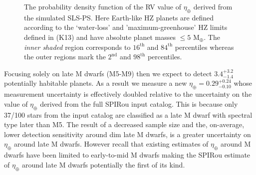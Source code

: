 \begin{figure}
  \centering
  \caption{The probability density function of the RV value of $\eta_{\oplus}$ derived from
    the simulated SLS-PS. Here Earth-like HZ planets are defined according to the `water-loss'
    and 'maximum-greenhouse' HZ limits defined in \citealt{kopparapu13} (K13) and have absolute planet
    masses $\leq 5$ M$_{\oplus}$. The \emph{inner shaded} region corresponds to $16^{\text{th}}$ and
    $84^{\text{th}}$ percentiles whereas the outer regions mark the $2^{\text{nd}}$ and
    $98^{\text{th}}$ percentiles.}
  \label{BSfig:etaEarth}
\end{figure}

Focusing solely on late M dwarfs (M5-M9) then we expect to detect
$3.4^{+3.2}_{-1.4}$ potentially habitable planets. As a result we measure a new 
$\eta_{\oplus}=0.29^{+0.24}_{-0.10}$ whose measurement uncertainty is effectively doubled 
relative to the uncertainty on the value of $\eta_{\oplus}$ derived from the full SPIRou input
catalog. This is because only 37/100 stars from the input catalog are
classified as a late M dwarf with spectral type later than M5. The result of a decreased sample size and the,
on-average, lower detection sensitivity around dim late M dwarfs, is a greater uncertainty
on $\eta_{\oplus}$ around late M dwarfs. However recall that existing estimates of $\eta_{\oplus}$
around M dwarfs have been limited to early-to-mid M dwarfs making the SPIRou estimate of
$\eta_{\oplus}$ around late M dwarfs potentially the first of its kind.


